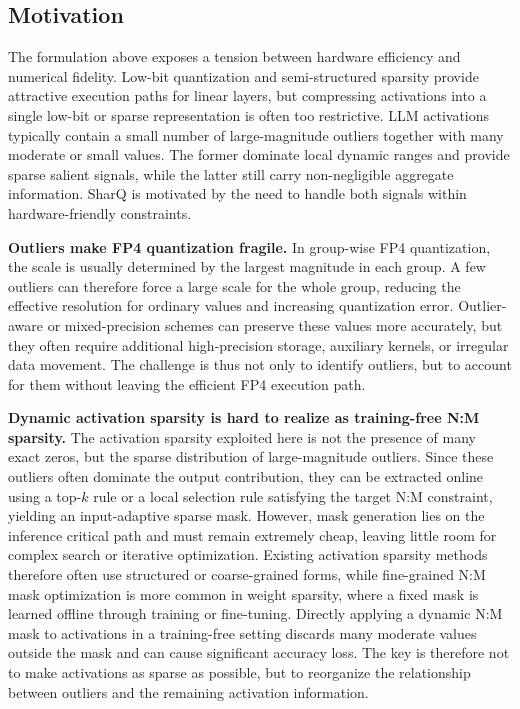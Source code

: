 \documentclass{article}
\begin{document}
\subsection{Motivation}

The formulation above exposes a tension between hardware efficiency and
numerical fidelity. Low-bit quantization and semi-structured sparsity provide
attractive execution paths for linear layers, but compressing activations into a
single low-bit or sparse representation is often too restrictive. LLM
activations typically contain a small number of large-magnitude outliers together
with many moderate or small values. The former dominate local dynamic ranges and
provide sparse salient signals, while the latter still carry non-negligible
aggregate information. SharQ is motivated by the need to handle both signals
within hardware-friendly constraints.

\textbf{Outliers make FP4 quantization fragile.}
In group-wise FP4 quantization, the scale is usually determined by the largest
magnitude in each group. A few outliers can therefore force a large scale for the
whole group, reducing the effective resolution for ordinary values and
increasing quantization error. Outlier-aware or mixed-precision schemes can
preserve these values more accurately, but they often require additional
high-precision storage, auxiliary kernels, or irregular data movement. The
challenge is thus not only to identify outliers, but to account for them without
leaving the efficient FP4 execution path.

\textbf{Dynamic activation sparsity is hard to realize as training-free N:M
sparsity.}
The activation sparsity exploited here is not the presence of many exact zeros,
but the sparse distribution of large-magnitude outliers. Since these outliers
often dominate the output contribution, they can be extracted online using a
top-$k$ rule or a local selection rule satisfying the target N:M constraint,
yielding an input-adaptive sparse mask. However, mask generation lies on the
inference critical path and must remain extremely cheap, leaving little room for
complex search or iterative optimization. Existing activation sparsity methods
therefore often use structured or coarse-grained forms, while fine-grained N:M
mask optimization is more common in weight sparsity, where a fixed mask is
learned offline through training or fine-tuning. Directly applying a dynamic N:M
mask to activations in a training-free setting discards many moderate values
outside the mask and can cause significant accuracy loss. The key is therefore
not to make activations as sparse as possible, but to reorganize the relationship
between outliers and the remaining activation information.
\end{document}
